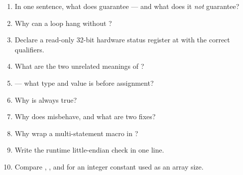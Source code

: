 \begin{scorecard}
\begin{enumerate}
\item In one sentence, what does  guarantee --- and what does
  it \emph{not} guarantee?
\item Why can a  loop hang without ?
\item Declare a read-only 32-bit hardware status register at 
  with the correct qualifiers.
\item What are the two unrelated meanings of ?
\item {} --- what type and value is 
  before assignment?
\item Why is  always true?
\item Why does  misbehave, and what are two fixes?
\item Why wrap a multi-statement macro in ?
\item Write the runtime little-endian check in one line.
\item Compare , , and  for an integer
  constant used as an array size.
\end{enumerate}
\end{scorecard}

